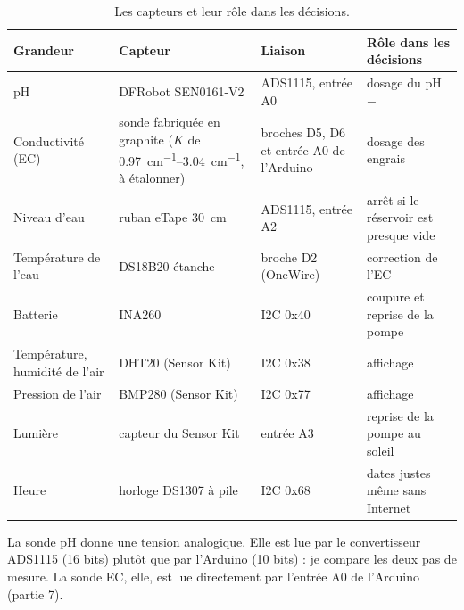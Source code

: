 \begin{table}[H]
\centering
\small
\begin{tabularx}{\textwidth}{|l|l|l|Y|}
\hline
\textbf{Grandeur} & \textbf{Capteur} & \textbf{Liaison} & \textbf{Rôle dans les décisions} \\
\hline
pH & DFRobot SEN0161-V2 & ADS1115, entrée A0 & dosage du pH$-$ \\
\hline
Conductivité (EC) & sonde fabriquée en graphite ($K$ de \qtyrange{0,97}{3,04}{cm^{-1}}, à étalonner) & broches D5, D6 et entrée A0 de l'Arduino & dosage des engrais \\
\hline
Niveau d'eau & ruban eTape \qty{30}{cm} & ADS1115, entrée A2 & arrêt si le réservoir est presque vide \\
\hline
Température de l'eau & DS18B20 étanche & broche D2 (OneWire) & correction de l'EC \\
\hline
Batterie & INA260 & I2C 0x40 & coupure et reprise de la pompe \\
\hline
Température, humidité de l'air & DHT20 (Sensor Kit) & I2C 0x38 & affichage \\
\hline
Pression de l'air & BMP280 (Sensor Kit) & I2C 0x77 & affichage \\
\hline
Lumière & capteur du Sensor Kit & entrée A3 & reprise de la pompe au soleil \\
\hline
Heure & horloge DS1307 à pile & I2C 0x68 & dates justes même sans Internet \\
\hline
\end{tabularx}
\caption{Les capteurs et leur rôle dans les décisions.}
\end{table}

La sonde pH donne une tension analogique. Elle est lue par le convertisseur ADS1115 (16 bits) plutôt que par l'Arduino (10 bits) : je compare les deux pas de mesure. La sonde EC, elle, est lue directement par l'entrée A0 de l'Arduino (partie 7).

